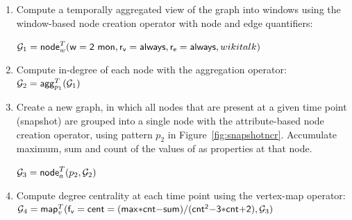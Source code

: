 \begin{enumerate}[itemindent=\dimexpr\labelwidth+\labelsep\relax,leftmargin=0pt]
\item Compute a temporally aggregated view of the graph into windows
  using the window-based node creation operator with 
  node and edge quantifiers:

$\mathcal{G}_1 = \textsf{node}^T_w(\mathsf{w=2~mon},\mathsf{r_v=always},\mathsf{r_e=always},wikitalk)$

\item Compute in-degree of each node with the aggregation operator:  $\mathcal{G}_2 = \textsf{agg}^T_{p_1}(\mathcal{G}_1)$

\item Create a new graph, in which all nodes that are present at a
  given time point (snapshot) are grouped into a single node with the
  attribute-based node creation operator, using pattern $p_2$ in
  Figure~\ref{fig:snapshotncr}.  Accumulate maximum, sum and count of the
  values of  as properties at that node.

$\mathcal{G}_3 =\textsf{node}^T_a(p_2,\mathcal{G}_2)$

%

\item Compute degree centrality at each time point using the vertex-map operator:  $\medmuskip=0mu\ttt_4 = \vmap{\mathsf{f_v=cent=(max*cnt-sum)/(cnt^2-3*cnt+2)}, \ttt_3}$
\end{enumerate}

